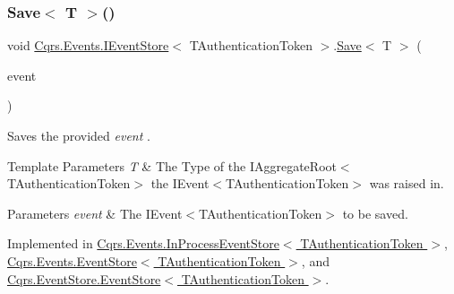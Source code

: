 \subsubsection{\texorpdfstring{Save$<$ T $>$()}{Save< T >()}}
{\footnotesize\ttfamily void \hyperlink{interfaceCqrs_1_1Events_1_1IEventStore}{Cqrs.\+Events.\+I\+Event\+Store}$<$ T\+Authentication\+Token $>$.\hyperlink{interfaceCqrs_1_1Events_1_1IEventStore_a81fb586703e7c6dea6b23d9a95f3887a_a81fb586703e7c6dea6b23d9a95f3887a}{Save}$<$ T $>$ (\begin{DoxyParamCaption}\item[{\hyperlink{interfaceCqrs_1_1Events_1_1IEvent}{I\+Event}$<$ T\+Authentication\+Token $>$ @}]{event }\end{DoxyParamCaption})}



Saves the provided {\itshape event} . 


\begin{DoxyTemplParams}{Template Parameters}
{\em T} & The Type of the I\+Aggregate\+Root$<$\+T\+Authentication\+Token$>$ the I\+Event$<$\+T\+Authentication\+Token$>$ was raised in.\\
\hline
\end{DoxyTemplParams}

\begin{DoxyParams}{Parameters}
{\em event} & The I\+Event$<$\+T\+Authentication\+Token$>$ to be saved.\\
\hline
\end{DoxyParams}


Implemented in \hyperlink{classCqrs_1_1Events_1_1InProcessEventStore_ace191a5083a6ddd308dbbc302dc5bd8e_ace191a5083a6ddd308dbbc302dc5bd8e}{Cqrs.\+Events.\+In\+Process\+Event\+Store$<$ T\+Authentication\+Token $>$}, \hyperlink{classCqrs_1_1Events_1_1EventStore_a958854f49c3eb4fcf1922ba7737a8dfe_a958854f49c3eb4fcf1922ba7737a8dfe}{Cqrs.\+Events.\+Event\+Store$<$ T\+Authentication\+Token $>$}, and \hyperlink{classCqrs_1_1EventStore_1_1EventStore_a7261e5b74f55ef7afd23144c155ba116_a7261e5b74f55ef7afd23144c155ba116}{Cqrs.\+Event\+Store.\+Event\+Store$<$ T\+Authentication\+Token $>$}.

